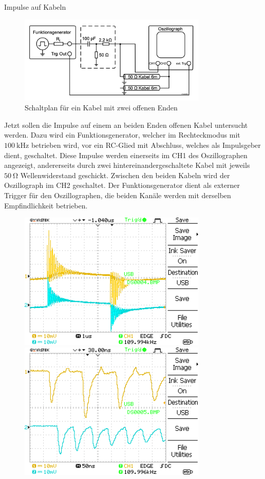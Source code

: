 \documentclass[ngerman]{scrartcl}
\theoremstyle{definition}
\begin{document}
		\begin{aufgabe}{Impulse auf Kabeln}
			\aufbau
			\begin{figure}[H]
				\centering
				\includegraphics[width=0.8\textwidth]{figs/Aufbau_1_2_Impulse_auf_Kabeln.png}
				\caption{Schaltplan für ein Kabel mit zwei offenen Enden~\cite{anleitung}}
				\label{fig:aufbau_1_1_impulseAufKabeln}
			\end{figure}
			Jetzt sollen die Impulse auf einem an beiden Enden offenen Kabel untersucht werden. Dazu wird ein Funktionsgenerator, welcher im Rechteckmodus mit $\SI{100}{\kilo\hertz}$ betrieben wird, vor ein RC-Glied mit Abschluss, welches als Impulsgeber dient, geschaltet. Diese Impulse werden einerseits im CH1 des Oszillographen angezeigt, andererseits durch zwei hintereinandergeschaltete Kabel mit jeweils $\SI{50}{\ohm}$ Wellenwiderstand geschickt. Zwischen den beiden Kabeln wird der Oszillograph im CH2 geschaltet. Der Funktionsgenerator dient als externer Trigger für den Oszillographen, die beiden Kanäle werden mit derselben Empfindlichkeit betrieben.
			\messwerte
			\begin{figure}[H]
				\centering
				\includegraphics[width=0.8\textwidth]{MesswerteVersuch1/DS0004.png}
				\includegraphics[width=0.8\textwidth]{MesswerteVersuch1/DS0005.png}

\end{figure}
\end{aufgabe}
\end{document}
